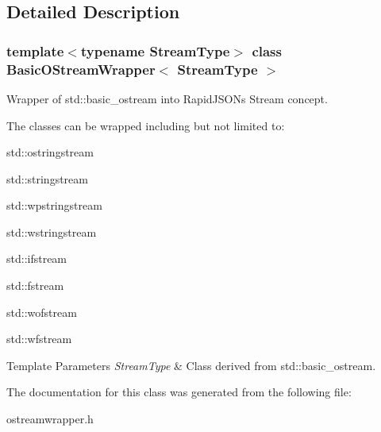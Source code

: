 \subsection{Detailed Description}
\subsubsection*{template$<$typename Stream\+Type$>$\newline
class Basic\+O\+Stream\+Wrapper$<$ Stream\+Type $>$}

Wrapper of {\ttfamily std\+::basic\+\_\+ostream} into Rapid\+J\+S\+ON\textquotesingle{}s Stream concept. 

The classes can be wrapped including but not limited to\+:


\begin{DoxyItemize}
\item {\ttfamily std\+::ostringstream} 
\item {\ttfamily std\+::stringstream} 
\item {\ttfamily std\+::wpstringstream} 
\item {\ttfamily std\+::wstringstream} 
\item {\ttfamily std\+::ifstream} 
\item {\ttfamily std\+::fstream} 
\item {\ttfamily std\+::wofstream} 
\item {\ttfamily std\+::wfstream} 
\end{DoxyItemize}


\begin{DoxyTemplParams}{Template Parameters}
{\em Stream\+Type} & Class derived from {\ttfamily std\+::basic\+\_\+ostream}. \\
\hline
\end{DoxyTemplParams}


The documentation for this class was generated from the following file\+:\begin{DoxyCompactItemize}
\item 
ostreamwrapper.\+h\end{DoxyCompactItemize}
